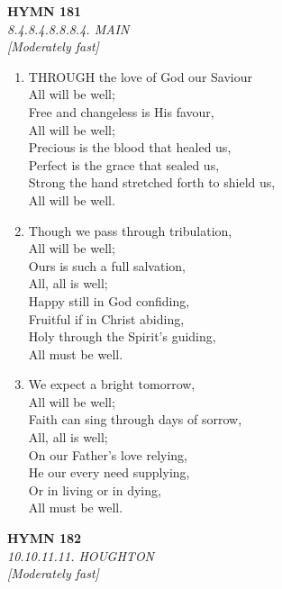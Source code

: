 \newpage
\begin{center}
    {\Large \textbf{HYMN 181}}
    \\
    \textit{8.4.8.4.8.8.8.4. MAIN}
    \\
    \textit{\small [Moderately fast]}
\end{center}
\vspace{1em}

\begin{enumerate}
    \item THROUGH the love of God our Saviour \\
        All will be well; \\
        Free and changeless is His favour, \\
        All will be well; \\
        Precious is the blood that healed us, \\
        Perfect is the grace that sealed us, \\
        Strong the hand stretched forth to shield us, \\
        All will be well.

    \item Though we pass through tribulation, \\
        All will be well; \\
        Ours is such a full salvation, \\
        All, all is well; \\
        Happy still in God confiding, \\
        Fruitful if in Christ abiding, \\
        Holy through the Spirit's guiding, \\
        All must be well.

    \item We expect a bright tomorrow, \\
        All will be well; \\
        Faith can sing through days of sorrow, \\
        All, all is well; \\
        On our Father's love relying, \\
        He our every need supplying, \\
        Or in living or in dying, \\
        All must be well.

\end{enumerate}

\newpage
\begin{center}
    {\Large \textbf{HYMN 182}}
    \\
    \textit{10.10.11.11. HOUGHTON}
    \\
    \textit{\small [Moderately fast]}
\end{center}
\vspace{1em}


